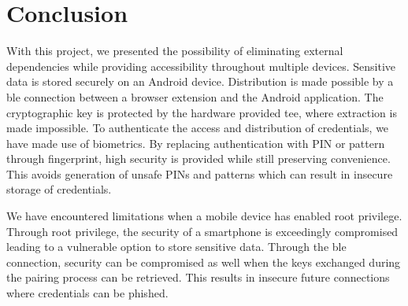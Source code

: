 \section{Conclusion} \label{conclusion}
With this project, we presented the possibility of eliminating external dependencies while providing accessibility throughout multiple devices. Sensitive data is stored securely on an Android device. Distribution is made possible by a \gls{ble} connection between a browser extension and the Android application. The cryptographic key is protected by the hardware provided \gls{tee}, where extraction is made impossible. To authenticate the access and distribution of credentials, we have made use of biometrics. By replacing authentication with PIN or pattern through fingerprint, high security is provided while still preserving convenience. This avoids generation of unsafe PINs and patterns which can result in insecure storage of credentials.

We have encountered limitations when a mobile device has enabled root privilege. Through root privilege, the security of a smartphone is exceedingly compromised leading to a vulnerable option to store sensitive data. Through the \gls{ble} connection, security can be compromised as well when the keys exchanged during the pairing process can be retrieved. This results in insecure future connections where credentials can be phished.

